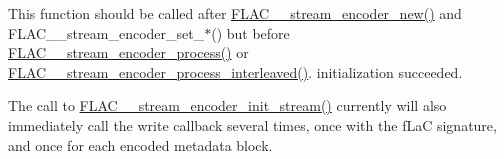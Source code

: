 This function should be called after \mbox{\hyperlink{group__flac__stream__encoder_ga35f3d94452bcf0a90a31c7d770b200bc}{F\+L\+A\+C\+\_\+\+\_\+stream\+\_\+encoder\+\_\+new()}} and F\+L\+A\+C\+\_\+\+\_\+stream\+\_\+encoder\+\_\+set\+\_\+$\ast$() but before \mbox{\hyperlink{group__flac__stream__encoder_gae187ec4f6cab3ca109637996ee23272d}{F\+L\+A\+C\+\_\+\+\_\+stream\+\_\+encoder\+\_\+process()}} or \mbox{\hyperlink{group__flac__stream__encoder_ga67c2ff5b23b945180797de420b1f27c0}{F\+L\+A\+C\+\_\+\+\_\+stream\+\_\+encoder\+\_\+process\+\_\+interleaved()}}. initialization succeeded.

The call to \mbox{\hyperlink{group__flac__stream__encoder_ga85221c4ceb9f22dfd4983d8f07a9a35b}{F\+L\+A\+C\+\_\+\+\_\+stream\+\_\+encoder\+\_\+init\+\_\+stream()}} currently will also immediately call the write callback several times, once with the {\ttfamily f\+LaC} signature, and once for each encoded metadata block.


